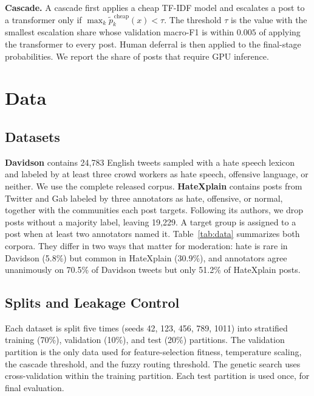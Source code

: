 \documentclass[lettersize,journal]{IEEEtran}
\begin{document}
\textbf{Cascade.} A cascade first applies a cheap TF-IDF model and escalates a post to a transformer only if $\max_k \tilde{p}^{\,\mathrm{cheap}}_k(x)<\tau$. The threshold $\tau$ is the value with the smallest escalation share whose validation macro-F1 is within $0.005$ of applying the transformer to every post. Human deferral is then applied to the final-stage probabilities. We report the share of posts that require GPU inference.

\section{Data}
\subsection{Datasets}
\textbf{Davidson} \cite{davidson2017automated} contains 24,783 English tweets sampled with a hate speech lexicon and labeled by at least three crowd workers as hate speech, offensive language, or neither. We use the complete released corpus. \textbf{HateXplain} \cite{mathew2021hatexplain} contains posts from Twitter and Gab labeled by three annotators as hate, offensive, or normal, together with the communities each post targets. Following its authors, we drop posts without a majority label, leaving 19,229. A target group is assigned to a post when at least two annotators named it. Table~\ref{tab:data} summarizes both corpora. They differ in two ways that matter for moderation: hate is rare in Davidson (5.8\%) but common in HateXplain (30.9\%), and annotators agree unanimously on 70.5\% of Davidson tweets but only 51.2\% of HateXplain posts.

\begin{table}[t]
\centering
\caption{Dataset Statistics}
\label{tab:data}
\footnotesize
\setlength{\tabcolsep}{3pt}

\end{table}

\subsection{Splits and Leakage Control}
Each dataset is split five times (seeds 42, 123, 456, 789, 1011) into stratified training (70\%), validation (10\%), and test (20\%) partitions. The validation partition is the only data used for feature-selection fitness, temperature scaling, the cascade threshold, and the fuzzy routing threshold. The genetic search uses cross-validation within the training partition. Each test partition is used once, for final evaluation.
\end{document}
